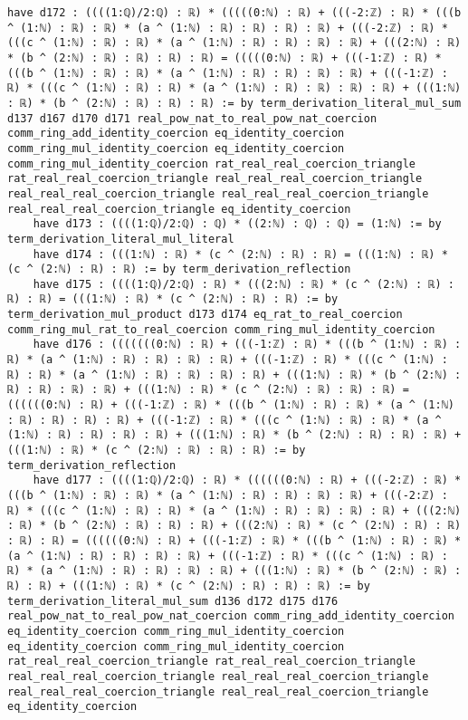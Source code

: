 \documentclass{article}
\begin{document}
\begin{tcolorbox}[colback=white!10, width=\linewidth]
\begin{lstlisting}[language=Lean4]
    have d172 : ((((1:ℚ)/2:ℚ) : ℝ) * (((((0:ℕ) : ℝ) + (((-2:ℤ) : ℝ) * (((b ^ (1:ℕ) : ℝ) : ℝ) * (a ^ (1:ℕ) : ℝ) : ℝ) : ℝ) : ℝ) + (((-2:ℤ) : ℝ) * (((c ^ (1:ℕ) : ℝ) : ℝ) * (a ^ (1:ℕ) : ℝ) : ℝ) : ℝ) : ℝ) + (((2:ℕ) : ℝ) * (b ^ (2:ℕ) : ℝ) : ℝ) : ℝ) : ℝ) = (((((0:ℕ) : ℝ) + (((-1:ℤ) : ℝ) * (((b ^ (1:ℕ) : ℝ) : ℝ) * (a ^ (1:ℕ) : ℝ) : ℝ) : ℝ) : ℝ) + (((-1:ℤ) : ℝ) * (((c ^ (1:ℕ) : ℝ) : ℝ) * (a ^ (1:ℕ) : ℝ) : ℝ) : ℝ) : ℝ) + (((1:ℕ) : ℝ) * (b ^ (2:ℕ) : ℝ) : ℝ) : ℝ) := by term_derivation_literal_mul_sum d137 d167 d170 d171 real_pow_nat_to_real_pow_nat_coercion comm_ring_add_identity_coercion eq_identity_coercion comm_ring_mul_identity_coercion eq_identity_coercion comm_ring_mul_identity_coercion rat_real_real_coercion_triangle rat_real_real_coercion_triangle real_real_real_coercion_triangle real_real_real_coercion_triangle real_real_real_coercion_triangle real_real_real_coercion_triangle eq_identity_coercion
    have d173 : ((((1:ℚ)/2:ℚ) : ℚ) * ((2:ℕ) : ℚ) : ℚ) = (1:ℕ) := by term_derivation_literal_mul_literal
    have d174 : (((1:ℕ) : ℝ) * (c ^ (2:ℕ) : ℝ) : ℝ) = (((1:ℕ) : ℝ) * (c ^ (2:ℕ) : ℝ) : ℝ) := by term_derivation_reflection
    have d175 : ((((1:ℚ)/2:ℚ) : ℝ) * (((2:ℕ) : ℝ) * (c ^ (2:ℕ) : ℝ) : ℝ) : ℝ) = (((1:ℕ) : ℝ) * (c ^ (2:ℕ) : ℝ) : ℝ) := by term_derivation_mul_product d173 d174 eq_rat_to_real_coercion comm_ring_mul_rat_to_real_coercion comm_ring_mul_identity_coercion
    have d176 : (((((((0:ℕ) : ℝ) + (((-1:ℤ) : ℝ) * (((b ^ (1:ℕ) : ℝ) : ℝ) * (a ^ (1:ℕ) : ℝ) : ℝ) : ℝ) : ℝ) + (((-1:ℤ) : ℝ) * (((c ^ (1:ℕ) : ℝ) : ℝ) * (a ^ (1:ℕ) : ℝ) : ℝ) : ℝ) : ℝ) + (((1:ℕ) : ℝ) * (b ^ (2:ℕ) : ℝ) : ℝ) : ℝ) : ℝ) + (((1:ℕ) : ℝ) * (c ^ (2:ℕ) : ℝ) : ℝ) : ℝ) = ((((((0:ℕ) : ℝ) + (((-1:ℤ) : ℝ) * (((b ^ (1:ℕ) : ℝ) : ℝ) * (a ^ (1:ℕ) : ℝ) : ℝ) : ℝ) : ℝ) + (((-1:ℤ) : ℝ) * (((c ^ (1:ℕ) : ℝ) : ℝ) * (a ^ (1:ℕ) : ℝ) : ℝ) : ℝ) : ℝ) + (((1:ℕ) : ℝ) * (b ^ (2:ℕ) : ℝ) : ℝ) : ℝ) + (((1:ℕ) : ℝ) * (c ^ (2:ℕ) : ℝ) : ℝ) : ℝ) := by term_derivation_reflection
    have d177 : ((((1:ℚ)/2:ℚ) : ℝ) * ((((((0:ℕ) : ℝ) + (((-2:ℤ) : ℝ) * (((b ^ (1:ℕ) : ℝ) : ℝ) * (a ^ (1:ℕ) : ℝ) : ℝ) : ℝ) : ℝ) + (((-2:ℤ) : ℝ) * (((c ^ (1:ℕ) : ℝ) : ℝ) * (a ^ (1:ℕ) : ℝ) : ℝ) : ℝ) : ℝ) + (((2:ℕ) : ℝ) * (b ^ (2:ℕ) : ℝ) : ℝ) : ℝ) + (((2:ℕ) : ℝ) * (c ^ (2:ℕ) : ℝ) : ℝ) : ℝ) : ℝ) = ((((((0:ℕ) : ℝ) + (((-1:ℤ) : ℝ) * (((b ^ (1:ℕ) : ℝ) : ℝ) * (a ^ (1:ℕ) : ℝ) : ℝ) : ℝ) : ℝ) + (((-1:ℤ) : ℝ) * (((c ^ (1:ℕ) : ℝ) : ℝ) * (a ^ (1:ℕ) : ℝ) : ℝ) : ℝ) : ℝ) + (((1:ℕ) : ℝ) * (b ^ (2:ℕ) : ℝ) : ℝ) : ℝ) + (((1:ℕ) : ℝ) * (c ^ (2:ℕ) : ℝ) : ℝ) : ℝ) := by term_derivation_literal_mul_sum d136 d172 d175 d176 real_pow_nat_to_real_pow_nat_coercion comm_ring_add_identity_coercion eq_identity_coercion comm_ring_mul_identity_coercion eq_identity_coercion comm_ring_mul_identity_coercion rat_real_real_coercion_triangle rat_real_real_coercion_triangle real_real_real_coercion_triangle real_real_real_coercion_triangle real_real_real_coercion_triangle real_real_real_coercion_triangle eq_identity_coercion

\end{lstlisting}
\end{tcolorbox}
\end{document}
